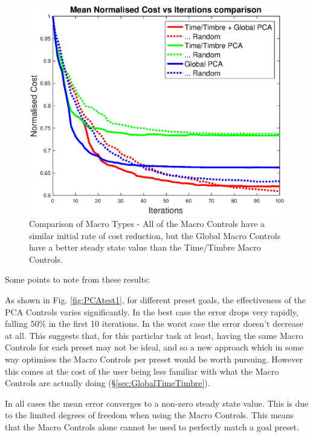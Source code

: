 \documentclass[11pt, oneside]{report}   	%
\begin{document}
\begin{figure}
	\centering
		\vspace{-40pt}
	\includegraphics[width = \textwidth]{PCAInterfaceTests2.eps}
	\caption{Comparison of Macro Types - All of the Macro Controls have a similar initial rate of cost reduction, but the Global Macro Controls have a better steady state value than the Time/Timbre Macro Controls.}
	\label{fig:PCAtest2}
\end{figure}

Some points to note from these results:

As shown in Fig. \ref{fig:PCAtest1}, for different preset goals, the effectiveness of the PCA Controls varies significantly. In the best case the error drops very rapidly, falling 50\% in the first 10 iterations. In the worst case the error doesn't decrease at all. This suggests that, for this particlar task at least, having the same Macro Controls for each preset may not be ideal, and so a new approach which in some way optimises the Macro Controls per preset would be worth pursuing. However this comes at the cost of the user being less familiar with what the Macro Controls are actually doing (\S \ref{sec:GlobalTimeTimbre}).

In all cases the mean error converges to a non-zero steady state value. This is due to the limited degrees of freedom when using the Macro Controls. This means that the Macro Controls alone cannot be used to perfectly match a goal preset.
\end{document}
